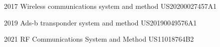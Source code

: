\begin{cvpatents}
  \cvpatent
    {2017} %
    {Wireless communications system and method} %
    {US20200027457A1} %

  \cvpatent
    {2019} %
    {Ads-b transponder system and method} %
    {US20190049576A1} %

  \cvpatent
    {2021} %
    {RF Communications System and Method} %
    {US11018764B2} %

\end{cvpatents}

